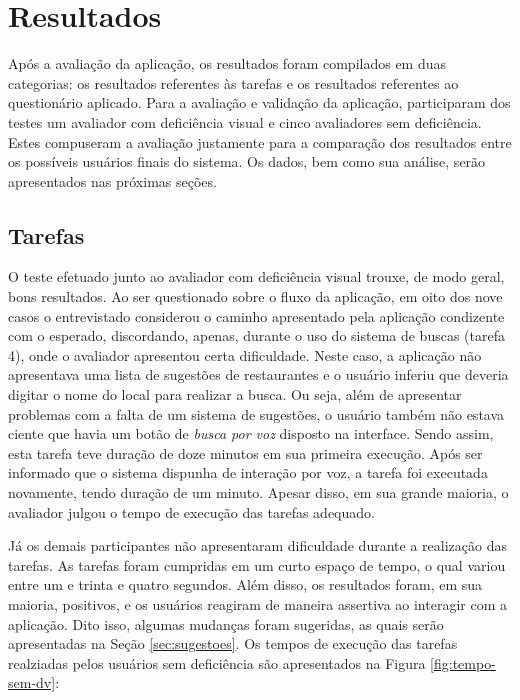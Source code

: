 \chapter{\label{chap:resultados}Resultados}

Após a avaliação da aplicação, os resultados foram compilados em duas categorias: os resultados referentes às tarefas e os resultados referentes ao questionário aplicado. Para a avaliação e validação da aplicação, participaram dos testes um avaliador com deficiência visual e cinco avaliadores sem deficiência. Estes compuseram a avaliação justamente para a comparação dos resultados entre os possíveis usuários finais do sistema. Os dados, bem como sua análise, serão apresentados nas próximas seções.

\section{Tarefas}

O teste efetuado junto ao avaliador com deficiência visual trouxe, de modo geral, bons resultados. Ao ser questionado sobre o fluxo da aplicação, em oito dos nove casos o entrevistado considerou o caminho apresentado pela aplicação condizente com o esperado, discordando, apenas, durante o uso do sistema de buscas (tarefa 4), onde o avaliador apresentou certa dificuldade. Neste caso, a aplicação não apresentava uma lista de sugestões de restaurantes e o usuário inferiu que deveria digitar o nome do local para realizar a busca. Ou seja, além de apresentar problemas com a falta de um sistema de sugestões, o usuário também não estava ciente que havia um botão de \emph{busca por voz} disposto na interface. Sendo assim, esta tarefa teve duração de doze minutos em sua primeira execução. Após ser informado que o sistema dispunha de interação por voz, a tarefa foi executada novamente, tendo duração de um minuto. Apesar disso, em sua grande maioria, o avaliador julgou o tempo de execução das tarefas adequado.

Já os demais participantes não apresentaram dificuldade durante a realização das tarefas. As tarefas foram cumpridas em um curto espaço de tempo, o qual variou entre um e trinta e quatro segundos. Além disso, os resultados foram, em sua maioria, positivos, e os usuários reagiram de maneira assertiva ao interagir com a aplicação. Dito isso, algumas mudanças foram sugeridas, as quais serão apresentadas na Seção \ref{sec:sugestoes}. Os tempos de execução das tarefas realziadas pelos usuários sem deficiência são apresentados na Figura \ref{fig:tempo-sem-dv}:

